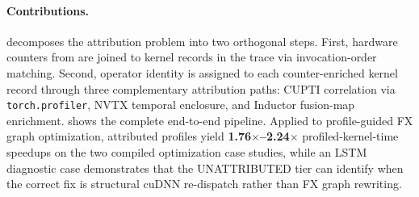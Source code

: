 \paragraph{Contributions.}
\sys decomposes the attribution problem into two orthogonal steps.
First, hardware counters from \ncu are joined to kernel records in the \nsys trace via
invocation-order matching.
Second, operator identity is assigned to each counter-enriched kernel record through three
complementary attribution paths: CUPTI correlation via \texttt{torch.profiler}, NVTX temporal
enclosure, and Inductor fusion-map enrichment.
 shows the complete end-to-end pipeline.
Applied to profile-guided FX graph optimization, attributed profiles yield
\textbf{1.76$\times$--2.24$\times$} profiled-kernel-time speedups on the two
compiled optimization case studies, while an LSTM diagnostic case demonstrates
that the UNATTRIBUTED tier can identify when the correct fix is structural
cuDNN re-dispatch rather than FX graph rewriting.

